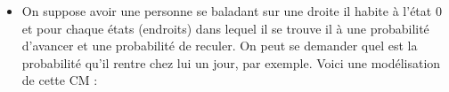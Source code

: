 \begin{exemple}
\begin{itemize}
\begin{center}
\begin{tikzpicture}[x=0.75pt,y=0.75pt,yscale=-1,xscale=1]
\end{tikzpicture}
\end{center}

\item [Marche aléatoire :] On suppose avoir une personne se baladant sur une droite il habite à l'état $0$ et pour chaque états (endroits) dans lequel il se trouve il à une probabilité d'avancer et une probabilité de reculer.
On peut se demander quel est la probabilité qu'il rentre chez lui un jour, par exemple. Voici une modélisation de cette CM :

\begin{center}
    


\begin{tikzpicture}[x=0.75pt,y=0.75pt,yscale=-1,xscale=1]


\end{tikzpicture}
\end{center}
\end{itemize}
\end{exemple}
